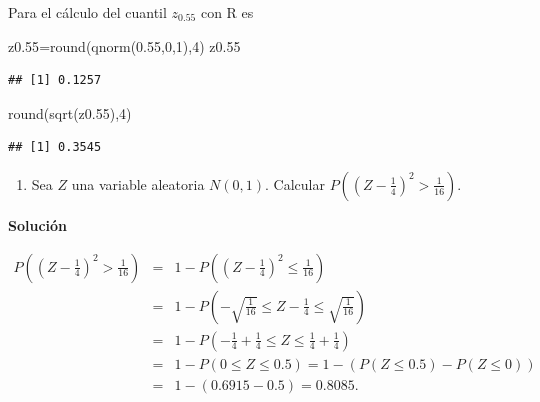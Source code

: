 \documentclass[
]{article}
\newenvironment{Shaded}{\begin{snugshade}}{\end{snugshade}}
\newcommand{\DecValTok}[1]{\textcolor[rgb]{0.00,0.00,0.81}{#1}}
\newcommand{\FloatTok}[1]{\textcolor[rgb]{0.00,0.00,0.81}{#1}}
\newcommand{\FunctionTok}[1]{\textcolor[rgb]{0.00,0.00,0.00}{#1}}
\newcommand{\NormalTok}[1]{#1}
\newcommand{\OtherTok}[1]{\textcolor[rgb]{0.56,0.35,0.01}{#1}}
\providecommand{\tightlist}{%
  \setlength{\itemsep}{0pt}\setlength{\parskip}{0pt}}
\begin{document}
Para el cálculo del cuantil \(z_{0.55}\) con R es

\begin{Shaded}
\begin{Highlighting}[]
\NormalTok{z0}\FloatTok{.55}\OtherTok{=}\FunctionTok{round}\NormalTok{(}\FunctionTok{qnorm}\NormalTok{(}\FloatTok{0.55}\NormalTok{,}\DecValTok{0}\NormalTok{,}\DecValTok{1}\NormalTok{),}\DecValTok{4}\NormalTok{)}
\NormalTok{z0}\FloatTok{.55}
\end{Highlighting}
\end{Shaded}

\begin{verbatim}
## [1] 0.1257
\end{verbatim}

\begin{Shaded}
\begin{Highlighting}[]
\FunctionTok{round}\NormalTok{(}\FunctionTok{sqrt}\NormalTok{(z0}\FloatTok{.55}\NormalTok{),}\DecValTok{4}\NormalTok{)}
\end{Highlighting}
\end{Shaded}

\begin{verbatim}
## [1] 0.3545
\end{verbatim}

\newpage

\begin{enumerate}
\def\labelenumi{\arabic{enumi}.}
\setcounter{enumi}{4}
\tightlist
\item
  Sea \(Z\) una variable aleatoria \(N(0,1)\). Calcular
  \(P\left(\left(Z-\frac{1}{4}\right)^2 >\frac{1}{16}\right)\).
\end{enumerate}

\textbf{Solución}

\begin{eqnarray*}
P\left(\left(Z-\frac{1}{4}\right)^2 >\frac{1}{16}\right)&=& 1-P\left(\left(Z-\frac{1}{4}\right)^2 \leq \frac{1}{16}\right)\\
&=&
1-P\left(-\sqrt{\frac{1}{16}}\leq Z-\frac{1}{4}\leq\sqrt{\frac{1}{16}} \right)\\
&=&
1-P\left(-\frac{1}{4}+\frac14\leq Z\leq  \frac{1}{4}+\frac14\right)\\
&=&
1-P(0\leq Z\leq 0.5 )=1-(P(Z\leq 0.5)-P(Z\leq 0))\\
&=& 1-(0.6915-0.5)=
0.8085.
\end{eqnarray*}

\newpage
\end{document}
